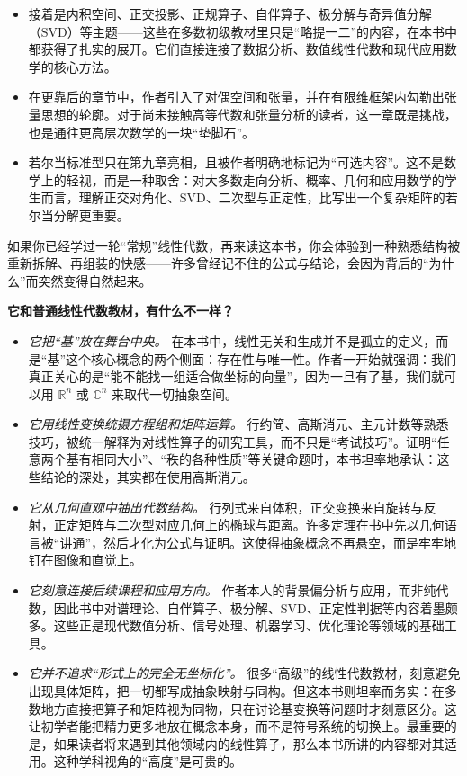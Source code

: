 \begin{preface}[推荐序]
\begin{itemize}
  \item 接着是内积空间、正交投影、正规算子、自伴算子、极分解与奇异值分解（SVD）等主题——这些在多数初级教材里只是“略提一二”的内容，在本书中都获得了扎实的展开。它们直接连接了数据分析、数值线性代数和现代应用数学的核心方法。

  \item 在更靠后的章节中，作者引入了对偶空间和张量，并在有限维框架内勾勒出张量思想的轮廓。对于尚未接触高等代数和张量分析的读者，这一章既是挑战，也是通往更高层次数学的一块“垫脚石”。

  \item 若尔当标准型只在第九章亮相，且被作者明确地标记为“可选内容”。这不是数学上的轻视，而是一种取舍：对大多数走向分析、概率、几何和应用数学的学生而言，理解正交对角化、SVD、二次型与正定性，比写出一个复杂矩阵的若尔当分解更重要。
\end{itemize}

如果你已经学过一轮“常规”线性代数，再来读这本书，你会体验到一种熟悉结构被重新拆解、再组装的快感——许多曾经记不住的公式与结论，会因为背后的“为什么”而突然变得自然起来。

\textbf{它和普通线性代数教材，有什么不一样？}

\begin{itemize}
  \item \emph{它把“基”放在舞台中央。}
  在本书中，线性无关和生成并不是孤立的定义，而是“基”这个核心概念的两个侧面：存在性与唯一性。作者一开始就强调：我们真正关心的是“能不能找一组适合做坐标的向量”，因为一旦有了基，我们就可以用 \(\mathbb{R}^n\) 或 \(\mathbb{C}^n\) 来取代一切抽象空间。

  \item \emph{它用线性变换统摄方程组和矩阵运算。}
  行约简、高斯消元、主元计数等熟悉技巧，被统一解释为对线性算子的研究工具，而不只是“考试技巧”。证明“任意两个基有相同大小”、“秩的各种性质”等关键命题时，本书坦率地承认：这些结论的深处，其实都在使用高斯消元。

  \item \emph{它从几何直观中抽出代数结构。}
  行列式来自体积，正交变换来自旋转与反射，正定矩阵与二次型对应几何上的椭球与距离。许多定理在书中先以几何语言被“讲通”，然后才化为公式与证明。这使得抽象概念不再悬空，而是牢牢地钉在图像和直觉上。

  \item \emph{它刻意连接后续课程和应用方向。}
  作者本人的背景偏分析与应用，而非纯代数，因此书中对谱理论、自伴算子、极分解、SVD、正定性判据等内容着墨颇多。这些正是现代数值分析、信号处理、机器学习、优化理论等领域的基础工具。

  \item \emph{它并不追求“形式上的完全无坐标化”。}
  很多“高级”的线性代数教材，刻意避免出现具体矩阵，把一切都写成抽象映射与同构。但这本书则坦率而务实：在多数地方直接把算子和矩阵视为同物，只在讨论基变换等问题时才刻意区分。这让初学者能把精力更多地放在概念本身，而不是符号系统的切换上。最重要的是，如果读者将来遇到其他领域内的线性算子，那么本书所讲的内容都对其适用。这种学科视角的“高度”是可贵的。
\end{itemize}


\end{preface}
